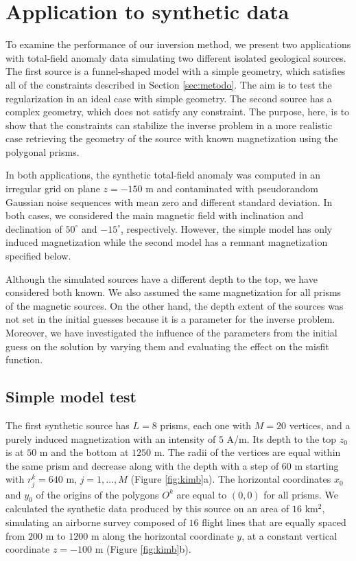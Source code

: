 \section{Application to synthetic data}

To examine the performance of our inversion method, we present two applications with total-field anomaly data simulating two different isolated geological sources. The first source is a funnel-shaped model with a simple geometry, which satisfies all of the constraints described in Section \ref{sec:metodo}. The aim is to test the regularization in an ideal case with simple geometry. The second source has a complex geometry, which does not satisfy any constraint. The purpose, here, is to show that the constraints can stabilize the inverse problem in a more realistic case retrieving the geometry of the source with known magnetization using the polygonal prisms.

In both applications, the synthetic total-field anomaly was computed in an irregular grid on plane $z=-150$ m and contaminated with pseudorandom Gaussian noise sequences with mean zero and different standard deviation. In both cases, we considered the main magnetic field with inclination and declination of $50^\circ$ and $-15^\circ$, respectively. However, the simple model has only induced magnetization while the second model has a remnant magnetization specified below.

Although the simulated sources have a different depth to the top, we have considered both known. We also assumed the same magnetization for all prisms of the magnetic sources. On the other hand, the depth extent of the sources was not set in the initial guesses because it is a parameter for the inverse problem. Moreover, we have investigated the influence of the parameters from the initial guess on the solution by varying them and evaluating the effect on the misfit function.

\subsection{Simple model test}

The first synthetic source has $L=8$ prisms, each one with $M = 20$ vertices, and a purely induced magnetization with an intensity of $5$ A/m. Its depth to the top $z_0$ is at $50$ m and the bottom at $1250$ m. The radii of the vertices are equal within the same prism and decrease along with the depth with a step of $60$ m starting with $r_j^k=640$ m, $j=1,\dots, M$ (Figure \ref{fig:kimb}a). The horizontal coordinates $x_0$ and $y_0$ of the origins of the polygons $O^k$ are equal to $(0,0)$ for all prisms. We calculated the synthetic data produced by this source on an area of $16$ km$^2$, simulating an airborne survey composed of $16$ flight lines that are equally spaced from $200$ m to $1200$ m along the horizontal coordinate $y$, at a constant vertical coordinate $z=-100$ m (Figure \ref{fig:kimb}b).

